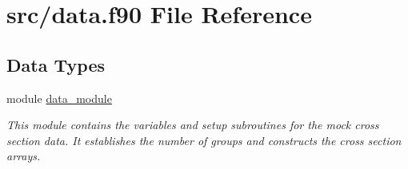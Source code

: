 \hypertarget{data_8f90}{\section{src/data.f90 File Reference}
\label{data_8f90}
}
\subsection*{Data Types}
\begin{DoxyCompactItemize}
\item 
module \hyperlink{classdata__module}{data\-\_\-module}
\begin{DoxyCompactList}\small\item\em This module contains the variables and setup subroutines for the mock cross section data. It establishes the number of groups and constructs the cross section arrays. \end{DoxyCompactList}\end{DoxyCompactItemize}
